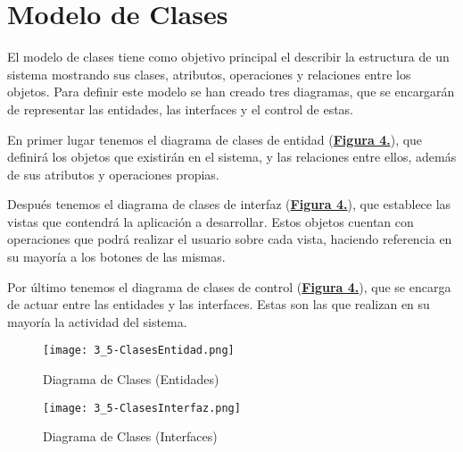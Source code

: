 \pagebreak
\section{Modelo de Clases}
\label{mc} El modelo de clases tiene como objetivo principal el describir la estructura de un sistema mostrando sus clases, atributos, operaciones y relaciones entre los objetos. Para definir este modelo se han creado tres diagramas, que se encargarán de representar las entidades, las interfaces y el control de estas. \\

\addtocounter{figura_cap4}{1}
En primer lugar tenemos el diagrama de clases de entidad (\textbf{\hyperref[fig:ClasesEntidad]{Figura 4.}}), que definirá los objetos que existirán en el sistema, y las relaciones entre ellos, además de sus atributos y operaciones propias. \\

\addtocounter{figura_cap4}{1}
Después tenemos el diagrama de clases de interfaz (\textbf{\hyperref[fig:ClasesInterfaz]{Figura 4.}}), que establece las vistas que contendrá la aplicación a desarrollar. Estos objetos cuentan con operaciones que podrá realizar el usuario sobre cada vista, haciendo referencia en su mayoría a los botones de las mismas. \\

\addtocounter{figura_cap4}{1}
Por último tenemos el diagrama de clases de control (\textbf{\hyperref[fig:ClasesControl]{Figura 4.}}), que se encarga de actuar entre las entidades y las interfaces. Estas son las que realizan en su mayoría la actividad del sistema.

\begin{landscape}
	\begin{figure}[!htbp]
	  \centering
	  \texttt{[image: 3\_5-ClasesEntidad.png]}
	  \caption{Diagrama de Clases (Entidades)}
	  \label{fig:ClasesEntidad}
	\end{figure}
\end{landscape}
\FloatBarrier

\begin{landscape}
  \begin{figure}[!htbp]
    \centering
    \texttt{[image: 3\_5-ClasesInterfaz.png]}
    \caption{Diagrama de Clases (Interfaces)}
    \label{fig:ClasesInterfaz}
  \end{figure}
\end{landscape}
\FloatBarrier


